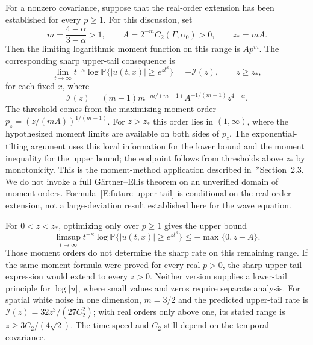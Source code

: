 For a nonzero covariance, suppose that the real-order extension has been
established for every $p \ge 1$. For this discussion, set
\[
  m=\frac{4-\alpha}{3-\alpha}>1,\qquad
  A=2^{-m}C_2(\Gamma,\alpha_0)>0,\qquad z_*=mA.
\]
Then the limiting logarithmic moment function on this range is $Ap^m$.
The corresponding sharp upper-tail consequence is
\begin{equation}\label{E:future-upper-tail}
  \lim_{t\to\infty}t^{-\kappa}
  \log\mathbb{P}\big\{|u(t,x)|\ge e^{zt^\kappa}\big\}
  =-\mathcal{I}(z),\qquad z\ge z_*,
\end{equation}
for each fixed $x$, where
\begin{equation}\label{E:future-tail-rate}
  \mathcal{I}(z)
  =(m-1)m^{-m/(m-1)}A^{-1/(m-1)}z^{4-\alpha}.
\end{equation}
The threshold comes from the maximizing moment order
$p_z=(z/(mA))^{1/(m-1)}$. For $z>z_*$ this order lies in $(1,\infty)$,
where the hypothesized moment limits are available on both sides of $p_z$.
The exponential-tilting argument uses this local information for the lower
bound and the moment inequality for the upper bound; the endpoint follows
from thresholds above $z_*$ by monotonicity. This is the moment-method
application described in~\cite{dembo.zeitouni:98:large}*{Section~2.3}.
We do not invoke a full G\"artner--Ellis theorem on an unverified domain of
moment orders. Formula~\eqref{E:future-upper-tail} is conditional on the
real-order extension, not a large-deviation result established here for the
wave equation.

For $0<z<z_*$, optimizing only over $p\ge1$ gives the upper bound
\[
  \limsup_{t\to\infty}t^{-\kappa}
  \log\mathbb{P}\big\{|u(t,x)|\ge e^{zt^\kappa}\big\}
  \le-\max\{0,z-A\}.
\]
Those moment orders do not determine the sharp rate on this remaining range.
If the same moment formula were proved for every real $p>0$, the sharp
upper-tail expression would extend to every $z>0$. Neither version supplies
a lower-tail principle for $\log|u|$, where small values and zeros require
separate analysis. For spatial white noise in one dimension,
$m=3/2$ and the predicted upper-tail rate is
$\mathcal{I}(z)=32z^3/(27C_2^2)$; with real orders only above one, its stated
range is $z\ge3C_2/(4\sqrt2)$. The time speed and $C_2$ still depend on the
temporal covariance.








